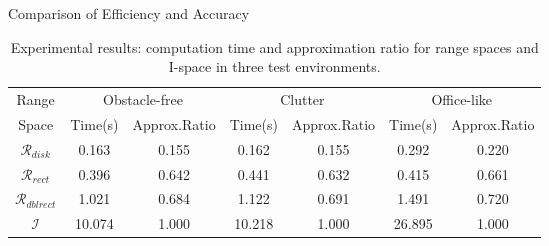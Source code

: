 \documentclass[10pt]{beamer}
\begin{document}
\begin{frame}{Comparison of Efficiency and Accuracy}
\begin{table}
  \scriptsize\centering
    \begin{tabular}{ccccccc} 
    \hline
    Range & \multicolumn{2}{c}{Obstacle-free} & \multicolumn{2}{c}{Clutter} & \multicolumn{2}{c}{Office-like}\\
    Space & Time(s) &Approx.Ratio& Time(s) &Approx.Ratio& Time(s) &Approx.Ratio \\
    \hline
    $\mathcal{R}_{disk}$ & 0.163 & 0.155 & 0.162 & 0.155  & 0.292 & 0.220 \\ 
    \hline
    $\mathcal{R}_{rect}$ & 0.396 & 0.642  & 0.441 & 0.632 & 0.415 & 0.661 \\
    \hline
    $\mathcal{R}_{dblrect}$ & 1.021 & 0.684 & 1.122 & 0.691 & 1.491 & 0.720 \\
    \hline
    $\mathcal{I}$ & 10.074 & 1.000 & 10.218 & 1.000 & 26.895 & 1.000 \\
    \hline
    \end{tabular}
    \caption{Experimental results: computation time and approximation
      ratio for range spaces and I-space in three test environments.}
    \label{tab:exp-data}
\end{table}
\end{frame}

\end{document}
